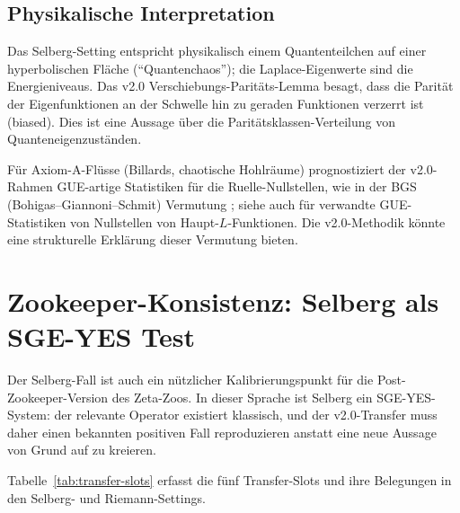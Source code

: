 \documentclass[12pt,a4paper]{article}
\theoremstyle{definition}
\theoremstyle{remark}
\begin{document}
\subsection{Physikalische Interpretation}

Das Selberg-Setting entspricht physikalisch einem Quantenteilchen auf einer
hyperbolischen Fläche (``Quantenchaos''); die Laplace-Eigenwerte sind die
Energieniveaus. Das v2.0 Verschiebungs-Paritäts-Lemma besagt, dass die Parität der
Eigenfunktionen an der Schwelle hin zu geraden Funktionen verzerrt ist (biased). Dies ist eine
Aussage über die Paritätsklassen-Verteilung von Quanteneigenzuständen.

Für Axiom-A-Flüsse (Billards, chaotische Hohlräume) prognostiziert der v2.0-Rahmen
GUE-artige Statistiken für die Ruelle-Nullstellen, wie in der BGS (Bohigas--Giannoni--Schmit)
Vermutung \cite{BGS1984}; siehe auch \cite{RudnickSarnak1996} für verwandte GUE-Statistiken
von Nullstellen von Haupt-$L$-Funktionen. Die v2.0-Methodik könnte eine
strukturelle Erklärung dieser Vermutung bieten.

\section{Zookeeper-Konsistenz: Selberg als SGE-YES Test}
\label{sec:zookeeper-selberg}

Der Selberg-Fall ist auch ein nützlicher Kalibrierungspunkt für die Post-Zookeeper-Version
des Zeta-Zoos.  In dieser Sprache ist Selberg ein SGE-YES-System:
der relevante Operator existiert klassisch, und der v2.0-Transfer muss
daher einen bekannten positiven Fall reproduzieren anstatt eine neue
Aussage von Grund auf zu kreieren.

Tabelle~\ref{tab:transfer-slots} erfasst die fünf Transfer-Slots und
ihre Belegungen in den Selberg- und Riemann-Settings.
\end{document}
